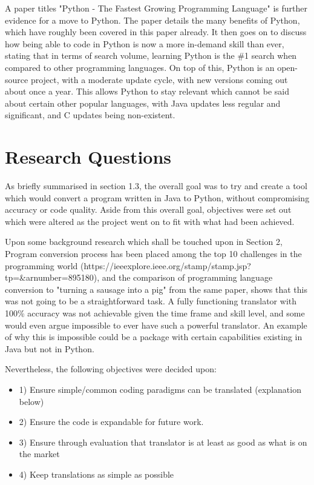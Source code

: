\documentclass{l4proj}
\begin{document}
A paper titles "Python - The Fastest Growing Programming Language" is further evidence for a move to Python. The paper details the many benefits of Python, which have roughly been covered in this paper already. It then goes on to discuss how being able to code in Python is now a more in-demand skill than ever, stating that in terms of search volume, learning Python is the \#1 search when compared to other programming languages. On top of this, Python is an open-source project, with a moderate update cycle, with new versions coming out about once a year. This allows Python to stay relevant which cannot be said about certain other popular languages, with Java updates less regular and significant, and C updates being non-existent.

\section{Research Questions}
As briefly summarised in section 1.3, the overall goal was to try and create a tool which would convert a program written in Java to Python, without compromising accuracy or code quality. Aside from this overall goal, objectives were set out which were altered as the project went on to fit with what had been achieved. 

Upon some background research which shall be touched upon in Section 2,  Program conversion process has been placed  among  the  top  10  challenges  in  the  programming  world (https://ieeexplore.ieee.org/stamp/stamp.jsp?tp=&arnumber=895180), and the comparison of programming language conversion to "turning a sausage into a pig" from the same paper, shows that this was not going to be a straightforward task. A fully functioning translator with 100\% accuracy was not achievable given the time frame and skill level, and some would even argue impossible to ever have such a powerful translator. An example of why this is impossible could be a package with certain capabilities existing in Java but not in Python.

Nevertheless, the following objectives were decided upon:
\begin{itemize}
    \item
    1) Ensure simple/common coding paradigms can be translated (explanation below)
    \item
    2) Ensure the code is expandable for future work.
    \item
    3) Ensure through evaluation that translator is at least as good as what is on the market
    \item
    4) Keep translations as simple as possible 
\end{itemize}
\end{document}
